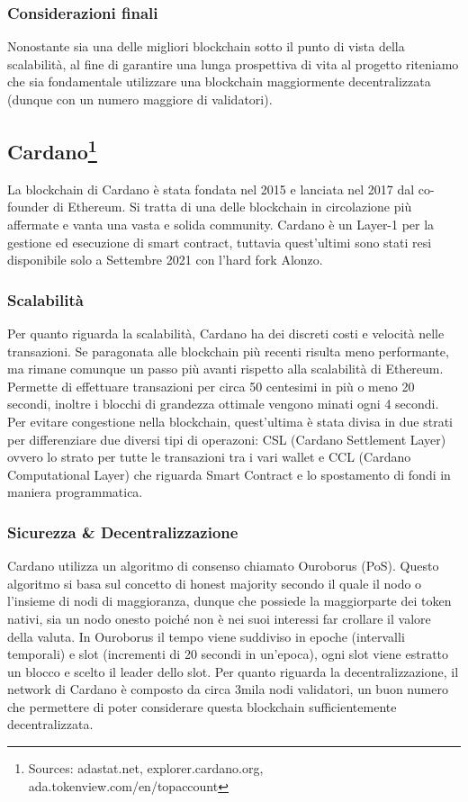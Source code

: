 \documentclass[a4paper, 12pt]{article}
\begin{document}
\subsubsection*{Considerazioni finali}
Nonostante sia una delle migliori blockchain sotto il punto di vista della scalabilità, al fine di garantire una lunga prospettiva di vita al progetto riteniamo che sia fondamentale utilizzare una blockchain maggiormente decentralizzata (dunque con un numero maggiore di validatori).

\newpage
\subsection*{Cardano\footnote{Sources: adastat.net, explorer.cardano.org, ada.tokenview.com/en/topaccount}}
La blockchain di Cardano è stata fondata nel 2015 e lanciata nel 2017 dal co-founder di Ethereum. Si tratta di una delle blockchain in circolazione più affermate e vanta una vasta e solida community. Cardano è un Layer-1 per la gestione ed esecuzione di smart contract, tuttavia quest'ultimi sono stati resi disponibile solo a Settembre 2021 con l'hard fork Alonzo.
\subsubsection*{Scalabilità}
Per quanto riguarda la scalabilità, Cardano ha dei discreti costi e velocità nelle transazioni. Se paragonata alle blockchain più recenti risulta meno performante, ma rimane comunque un passo più avanti rispetto alla scalabilità di Ethereum. Permette di effettuare transazioni per circa 50 centesimi in più o meno 20 secondi, inoltre i blocchi di grandezza ottimale vengono minati ogni 4 secondi. Per evitare congestione nella blockchain, quest'ultima è stata divisa in due strati per differenziare due diversi tipi di operazoni: CSL (Cardano Settlement Layer) ovvero lo strato per tutte le transazioni tra i vari wallet e CCL (Cardano Computational Layer) che riguarda Smart Contract e lo spostamento di fondi in maniera programmatica.
\subsubsection*{Sicurezza \& Decentralizzazione}
Cardano utilizza un algoritmo di consenso chiamato Ouroborus (PoS). Questo algoritmo si basa sul concetto di honest majority secondo il quale il nodo o l'insieme di nodi di maggioranza, dunque che possiede la maggiorparte dei token nativi, sia un nodo onesto poiché non è nei suoi interessi far crollare il valore della valuta. In Ouroborus il tempo viene suddiviso in epoche (intervalli temporali) e slot (incrementi di 20 secondi in un'epoca), ogni slot viene estratto un blocco e scelto il leader dello slot.
Per quanto riguarda la decentralizzazione, il network di Cardano è composto da circa 3mila nodi validatori, un buon numero che permettere di poter considerare questa blockchain sufficientemente decentralizzata.
\end{document}

